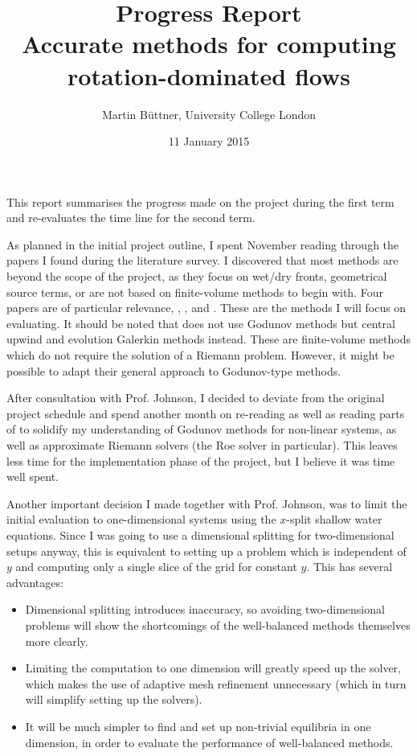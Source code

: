 \documentclass[a4paper,onecolumn,11pt]{article}
\title{Progress Report\\\small Accurate methods for computing rotation-dominated flows}
\author{Martin Büttner, University College London}
\date{11 January 2015}
\begin{document}
\maketitle

This report summarises the progress made on the project during the first term and re-evaluates the time line for the second term.

As planned in the initial project outline, I spent November reading through the papers I found during the literature survey. I discovered that most methods are beyond the scope of the project, as they focus on wet/dry fronts, geometrical source terms, or are not based on finite-volume methods to begin with. Four papers are of particular relevance, \citet{leveque1998balancing}, \citet{hubbard2000flux}, \citet{rogers2003mathematical} and \citet{chertockwell}. These are the methods I will focus on evaluating. It should be noted that \citet{chertockwell} does not use Godunov methods but central upwind and evolution Galerkin methods instead. These are finite-volume methods which do not require the solution of a Riemann problem. However, it might be possible to adapt their general approach to Godunov-type methods.

After consultation with Prof. Johnson, I decided to deviate from the original project schedule and spend another month on re-reading \citet{leveque2002finite} as well as reading parts of \citet{toro2001shock} to solidify my understanding of Godunov methods for non-linear systems, as well as approximate Riemann solvers (the Roe solver in particular). This leaves less time for the implementation phase of the project, but I believe it was time well spent.

Another important decision I made together with Prof. Johnson, was to limit the initial evaluation to one-dimensional systems using the $x$-split shallow water equations. Since I was going to use a dimensional splitting for two-dimensional setups anyway, this is equivalent to setting up a problem which is independent of $y$ and computing only a single slice of the grid for constant $y$. This has several advantages:

\begin{itemize}
  \item Dimensional splitting introduces inaccuracy, so avoiding two-dimensional problems will show the shortcomings of the well-balanced methods themselves more clearly.
  \item Limiting the computation to one dimension will greatly speed up the solver, which makes the use of adaptive mesh refinement unnecessary (which in turn will simplify setting up the solvers).
  \item It will be much simpler to find and set up non-trivial equilibria in one dimension, in order to evaluate the performance of well-balanced methods.
\end{itemize}
\end{document}
